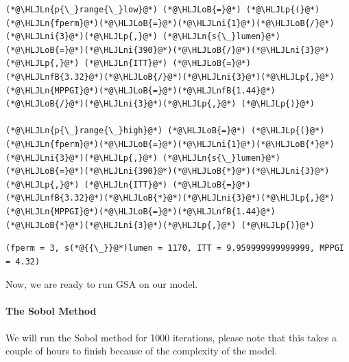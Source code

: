 \documentclass[12pt,a4paper]{article}
\newcommand{\HLJLn}[1]{#1}
\newcommand{\HLJLnfB}[1]{\textcolor[RGB]{59,151,46}{#1}}
\newcommand{\HLJLni}[1]{\textcolor[RGB]{59,151,46}{#1}}
\newcommand{\HLJLoB}[1]{\textcolor[RGB]{102,102,102}{\textbf{#1}}}
\newcommand{\HLJLp}[1]{#1}
\begin{document}
\begin{lstlisting}
(*@\HLJLn{p{\_}range{\_}low}@*) (*@\HLJLoB{=}@*) (*@\HLJLp{(}@*)(*@\HLJLn{fperm}@*)(*@\HLJLoB{=}@*)(*@\HLJLni{1}@*)(*@\HLJLoB{/}@*)(*@\HLJLni{3}@*)(*@\HLJLp{,}@*) (*@\HLJLn{s{\_}lumen}@*)(*@\HLJLoB{=}@*)(*@\HLJLni{390}@*)(*@\HLJLoB{/}@*)(*@\HLJLni{3}@*)(*@\HLJLp{,}@*) (*@\HLJLn{ITT}@*) (*@\HLJLoB{=}@*) (*@\HLJLnfB{3.32}@*)(*@\HLJLoB{/}@*)(*@\HLJLni{3}@*)(*@\HLJLp{,}@*) (*@\HLJLn{MPPGI}@*)(*@\HLJLoB{=}@*)(*@\HLJLnfB{1.44}@*)(*@\HLJLoB{/}@*)(*@\HLJLni{3}@*)(*@\HLJLp{,}@*) (*@\HLJLp{)}@*)

(*@\HLJLn{p{\_}range{\_}high}@*) (*@\HLJLoB{=}@*) (*@\HLJLp{(}@*)(*@\HLJLn{fperm}@*)(*@\HLJLoB{=}@*)(*@\HLJLni{1}@*)(*@\HLJLoB{*}@*)(*@\HLJLni{3}@*)(*@\HLJLp{,}@*) (*@\HLJLn{s{\_}lumen}@*)(*@\HLJLoB{=}@*)(*@\HLJLni{390}@*)(*@\HLJLoB{*}@*)(*@\HLJLni{3}@*)(*@\HLJLp{,}@*) (*@\HLJLn{ITT}@*) (*@\HLJLoB{=}@*) (*@\HLJLnfB{3.32}@*)(*@\HLJLoB{*}@*)(*@\HLJLni{3}@*)(*@\HLJLp{,}@*) (*@\HLJLn{MPPGI}@*)(*@\HLJLoB{=}@*)(*@\HLJLnfB{1.44}@*)(*@\HLJLoB{*}@*)(*@\HLJLni{3}@*)(*@\HLJLp{,}@*) (*@\HLJLp{)}@*)
\end{lstlisting}

\begin{lstlisting}
(fperm = 3, s(*@{{\_}}@*)lumen = 1170, ITT = 9.959999999999999, MPPGI = 4.32)
\end{lstlisting}


Now, we are ready to run GSA on our model.

\paragraph{The Sobol Method}
We will run the Sobol method for 1000 iterations, please note that this takes a couple of hours to finish because of the complexity of the model.
\end{document}

